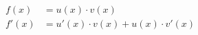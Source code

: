\documentclass[preview]{standalone}
\begin{document}
\begin{align*}
f(x) &= u(x) \cdot v(x)\\ f'(x) &= u'(x) \cdot v(x) + u(x) \cdot v'(x)
\end{align*}
\end{document}
